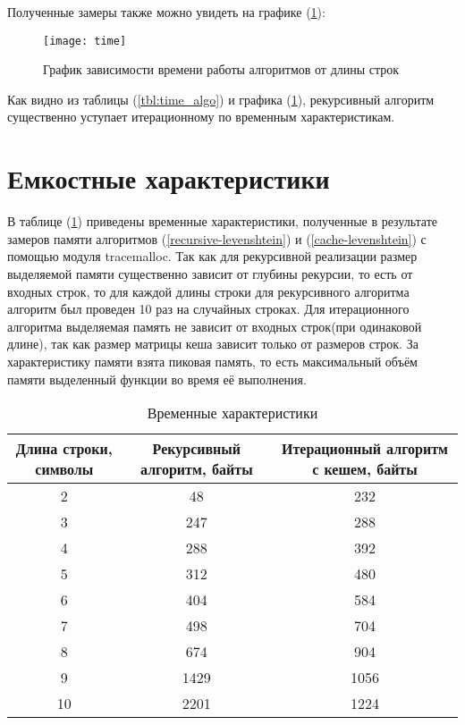 Полученные замеры также можно увидеть на графике (\ref{fig:time_graph}):

\begin{figure}
	\centering
	\texttt{[image: time]}
	\caption{График зависимости времени работы алгоритмов от длины строк}
	\label{fig:time_graph}
\end{figure}

Как видно из таблицы (\ref{tbl:time_algo}) и графика (\ref{fig:time_graph}), рекурсивный алгоритм существенно уступает итерационному по временным характеристикам.

\pagebreak

\section{Емкостные характеристики}

В таблице (\ref{tbl:mem_algo}) приведены временные характеристики, полученные в результате замеров памяти алгоритмов (\ref{recursive-levenshtein}) и (\ref{cache-levenshtein}) с помощью модуля tracemalloc. Так как для рекурсивной реализации размер выделяемой памяти существенно зависит от глубины рекурсии, то есть от входных строк, то для каждой длины строки для рекурсивного алгоритма алгоритм был проведен 10 раз на случайных строках. Для итерационного алгоритма выделяемая память не зависит от входных строк(при одинаковой длине), так как размер матрицы кеша зависит только от размеров строк. За характеристику памяти взята пиковая память, то есть максимальный объём памяти выделенный функции во время её выполнения.


\begin{table}[ht]
	\small
	\begin{center}
		\begin{threeparttable}
			\caption{Временные характеристики}
			\label{tbl:mem_algo}
			\begin{tabular}{|c|c|c|}
				\hline
				Длина строки, символы & Рекурсивный алгоритм, байты & Итерационный алгоритм с кешем, байты \\
				\hline
				2 & 48  & 232  \\
				\hline
				3 & 247  & 288  \\
				\hline
				4 & 288  & 392  \\
				\hline
				5 & 312  & 480  \\
				\hline
				6 & 404  & 584  \\
				\hline
				7 & 498  & 704  \\
				\hline
				8 & 674  & 904  \\
				\hline
				9 & 1429  & 1056  \\
				\hline
				10 & 2201  & 1224  \\
				\hline
			\end{tabular}	
		\end{threeparttable}
	\end{center}
\end{table}

